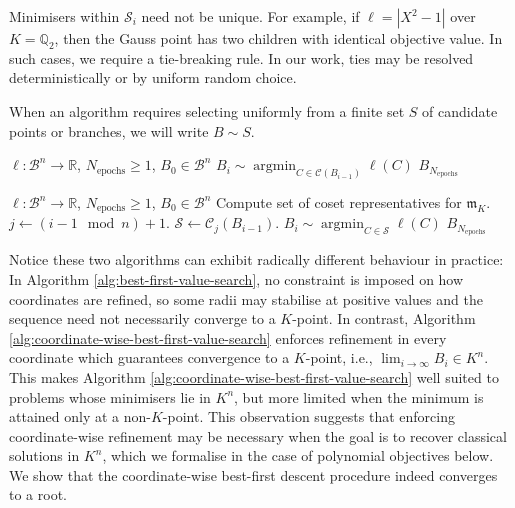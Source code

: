 \documentclass[10pt]{article}
\theoremstyle{definition}
\newcommand{\RR}{\mathbb{R}}
\newcommand{\QQ}{\mathbb{Q}}
\DeclareMathOperator*{\argmin}{\text{argmin}}
\begin{document}
Minimisers within $\mathcal{S}_i$ need not be unique. For example, if $\ell = |X^2-1|$ over $K = \QQ_2$, then the Gauss point has two children with identical objective value. In such cases, we require a tie-breaking rule. In our work, ties may be resolved deterministically or by uniform random choice.

When an algorithm requires selecting uniformly from a finite set $S$ of candidate points or branches, we will write $B \sim S$.

\begin{algorithm}[H]
  \begin{algorithmic}[1]
    \Require $\ell : \mathcal{B}^n \to \RR$, $N_\mathrm{epochs} \ge 1$, $B_0 \in \mathcal{B}^n$
      \State $B_i \sim \argmin_{C \in \mathcal{C}(B_{i-1})} \ell(C)$ 
    \EndFor
  \Return $B_{N_\mathrm{epochs}}$
  \end{algorithmic}
  \caption{Best-First Descent}
  \label{alg:best-first-value-search}
\end{algorithm}

\begin{algorithm}[H]
  \begin{algorithmic}[1]
    \Require $\ell : \mathcal{B}^n \to \RR$, $N_\mathrm{epochs} \ge 1$, $B_0 \in \mathcal{B}^n$
    \State Compute set of coset representatives for $\mathfrak{m}_K$.
      \State $j \gets (i-1 \mod n) + 1$.
      \State $\mathcal{S} \gets \mathcal{C}_j(B_{i-1})$.
      \State $B_i \sim \argmin_{C \in \mathcal{S}} \ell(C)$ 
    \EndFor
  \Return $B_{N_\mathrm{epochs}}$
  \end{algorithmic}
  \caption{Coordinate-wise Best-First Descent}
  \label{alg:coordinate-wise-best-first-value-search}
\end{algorithm}

Notice these two algorithms can exhibit radically different behaviour in practice: In Algorithm \ref{alg:best-first-value-search}, no constraint is imposed on how coordinates are refined, so some radii may stabilise at positive values and the sequence need not necessarily converge to a $K$-point. In contrast, Algorithm \ref{alg:coordinate-wise-best-first-value-search} enforces refinement in every coordinate which guarantees convergence to a $K$-point, i.e., $\lim_{i \to \infty} B_i \in K^n$. This makes Algorithm \ref{alg:coordinate-wise-best-first-value-search} well suited to problems whose minimisers lie in $K^n$, but more limited when the minimum is attained only at a non-$K$-point.  This observation suggests that enforcing coordinate-wise refinement may be necessary when the goal is to recover classical solutions in $K^n$, which we formalise in the case of polynomial objectives below. We show that the coordinate-wise best-first descent procedure indeed converges to a root.
\end{document}
